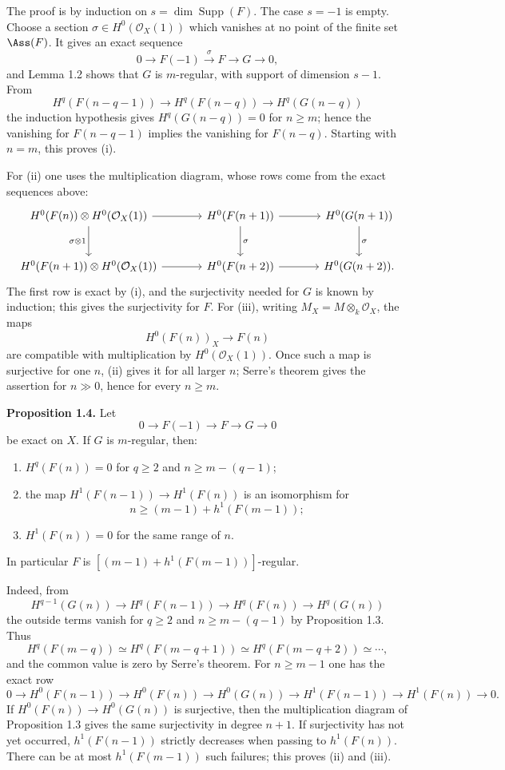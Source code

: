 \documentclass[11pt]{article}
\begin{document}
The proof is by induction on $s=\dim\operatorname{Supp}(F)$. The case $s=-1$ is empty. Choose a section $\sigma\in H^0(\mathcal O_X(1))$ which vanishes at no point of the finite set $\Ass(F)$. It gives an exact sequence
\[
0\longrightarrow F(-1)\xrightarrow{\sigma}F\longrightarrow G\longrightarrow 0,
\]
and Lemma 1.2 shows that $G$ is $m$-regular, with support of dimension $s-1$.
From
\[
H^q(F(n-q-1))\longrightarrow H^q(F(n-q))\longrightarrow H^q(G(n-q))
\]
the induction hypothesis gives $H^q(G(n-q))=0$ for $n\geq m$; hence the vanishing for $F(n-q-1)$ implies the vanishing for $F(n-q)$. Starting with $n=m$, this proves (i).

For (ii) one uses the multiplication diagram, whose rows come from the exact sequences above:
\[
\begin{tikzcd}[column sep=large,row sep=large]
H^0(F(n))\otimes H^0(\mathcal O_X(1)) \arrow[r] \arrow[d,"\sigma\otimes 1"'] & H^0(F(n+1)) \arrow[r] \arrow[d,"\sigma"] & H^0(G(n+1)) \arrow[d,"\sigma"] \\
H^0(F(n+1))\otimes H^0(\mathcal O_X(1)) \arrow[r] & H^0(F(n+2)) \arrow[r] & H^0(G(n+2)).
\end{tikzcd}
\]
The first row is exact by (i), and the surjectivity needed for $G$ is known by induction; this gives the surjectivity for $F$. For (iii), writing $M_X=M\otimes_k\mathcal O_X$, the maps
\[
H^0(F(n))_X\longrightarrow F(n)
\]
are compatible with multiplication by $H^0(\mathcal O_X(1))$. Once such a map is surjective for one $n$, (ii) gives it for all larger $n$; Serre's theorem gives the assertion for $n\gg0$, hence for every $n\ge m$.

\textbf{Proposition 1.4.} Let
\[
0\longrightarrow F(-1)\longrightarrow F\longrightarrow G\longrightarrow 0
\]
be exact on $X$. If $G$ is $m$-regular, then:
\begin{enumerate}[label=\roman*)]
\item $H^q(F(n))=0$ for $q\geq2$ and $n\geq m-(q-1)$;
\item the map $H^1(F(n-1))\to H^1(F(n))$ is an isomorphism for
\[
 n\ge (m-1)+h^1(F(m-1));
\]
\item $H^1(F(n))=0$ for the same range of $n$.
\end{enumerate}
In particular $F$ is $[(m-1)+h^1(F(m-1))]$-regular.

Indeed, from
\[
H^{q-1}(G(n))\longrightarrow H^q(F(n-1))\longrightarrow H^q(F(n))\longrightarrow H^q(G(n))
\]
the outside terms vanish for $q\ge2$ and $n\ge m-(q-1)$ by Proposition 1.3. Thus
\[
H^q(F(m-q))\simeq H^q(F(m-q+1))\simeq H^q(F(m-q+2))\simeq\cdots,
\]
and the common value is zero by Serre's theorem. For $n\ge m-1$ one has the exact row
\[
0\to H^0(F(n-1))\to H^0(F(n))\to H^0(G(n))\to H^1(F(n-1))\to H^1(F(n))\to0.
\]
If $H^0(F(n))\to H^0(G(n))$ is surjective, then the multiplication diagram of Proposition 1.3 gives the same surjectivity in degree $n+1$. If surjectivity has not yet occurred, $h^1(F(n-1))$ strictly decreases when passing to $h^1(F(n))$. There can be at most $h^1(F(m-1))$ such failures; this proves (ii) and (iii).
\end{document}
